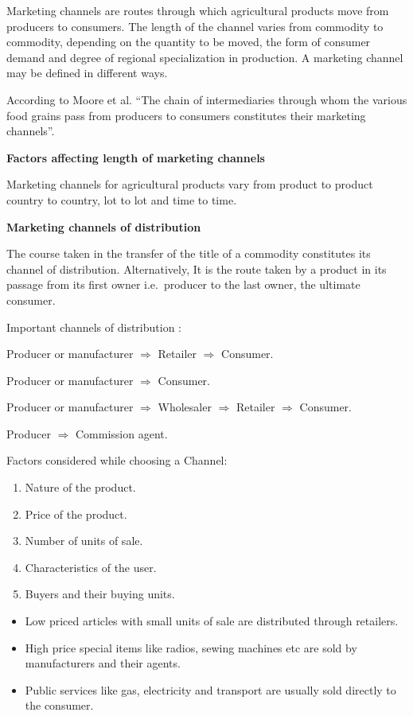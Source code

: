\documentclass[11pt,]{book}
\providecommand{\tightlist}{%
  \setlength{\itemsep}{0pt}\setlength{\parskip}{0pt}}
\theoremstyle{definition}
\theoremstyle{definition}
\theoremstyle{definition}
\theoremstyle{remark}
\begin{document}
Marketing channels are routes through which agricultural products move
from producers to consumers. The length of the channel varies from
commodity to commodity, depending on the quantity to be moved, the form
of consumer demand and degree of regional specialization in production.
A marketing channel may be defined in different ways.

According to Moore et al. ``The chain of intermediaries through whom the
various food grains pass from producers to consumers constitutes their
marketing channels''.

\textbf{Factors affecting length of marketing channels}

Marketing channels for agricultural products vary from product to
product country to country, lot to lot and time to time.

\textbf{Marketing channels of distribution}

The course taken in the transfer of the title of a commodity constitutes
its channel of distribution. Alternatively, It is the route taken by a
product in its passage from its first owner i.e.~producer to the last
owner, the ultimate consumer.

Important channels of distribution :

Producer or manufacturer \(\Longrightarrow\) Retailer
\(\Longrightarrow\) Consumer.

Producer or manufacturer \(\Longrightarrow\) Consumer.

Producer or manufacturer \(\Longrightarrow\) Wholesaler
\(\Longrightarrow\) Retailer \(\Longrightarrow\) Consumer.

Producer \(\Longrightarrow\) Commission agent.

Factors considered while choosing a Channel:

\begin{enumerate}
\def\labelenumi{\arabic{enumi}.}
\tightlist
\item
  Nature of the product.
\item
  Price of the product.
\item
  Number of units of sale.
\item
  Characteristics of the user.
\item
  Buyers and their buying units. \par
\end{enumerate}

\begin{itemize}
\tightlist
\item
  Low priced articles with small units of sale are distributed through
  retailers.
\item
  High price special items like radios, sewing machines etc are sold by
  manufacturers and their agents.
\item
  Public services like gas, electricity and transport are usually sold
  directly to the consumer.
\end{itemize}
\end{document}
